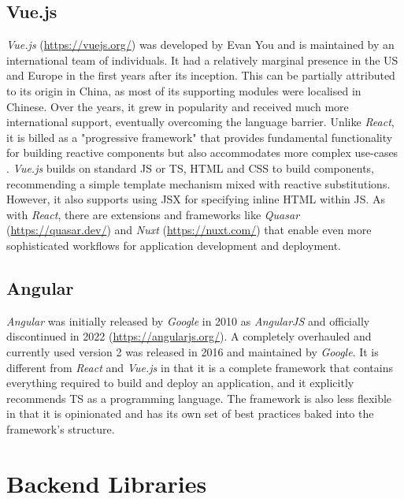 \subsection{Vue.js}

\emph{Vue.js} (\url{https://vuejs.org/}) was developed by Evan You and is maintained by an international team of individuals. It had a relatively marginal presence in the US and Europe in the first years after its inception. This can be partially attributed to its origin in China, as most of its supporting modules were localised in Chinese. Over the years, it grew in popularity and received much more international support, eventually overcoming the language barrier. Unlike \emph{React}, it is billed as a "progressive framework" that provides fundamental functionality for building reactive components but also accommodates more complex use-cases \parencite{vueProgressiveFramework}. \emph{Vue.js} builds on standard \ac{JS} or \ac{TS}, \ac{HTML} and \ac{CSS} to build components, recommending a simple template mechanism mixed with reactive substitutions. However, it also supports using \ac{JSX} for specifying inline \ac{HTML} within \ac{JS}. As with \emph{React}, there are extensions and frameworks like \emph{Quasar} (\url{https://quasar.dev/}) and \emph{Nuxt} (\url{https://nuxt.com/}) that enable even more sophisticated workflows for application development and deployment.

\subsection{Angular}

\emph{Angular} was initially released by \emph{Google} in 2010 as \emph{AngularJS}  and officially discontinued in 2022 (\url{https://angularjs.org/}). A completely overhauled and currently used version 2 was released in 2016 and maintained by \emph{Google}. It is different from \emph{React} and \emph{Vue.js} in that it is a complete framework that contains everything required to build and deploy an application, and it explicitly recommends \ac{TS} as a programming language. The framework is also less flexible in that it is opinionated and has its own set of best practices baked into the framework's structure.




\section{Backend Libraries}

